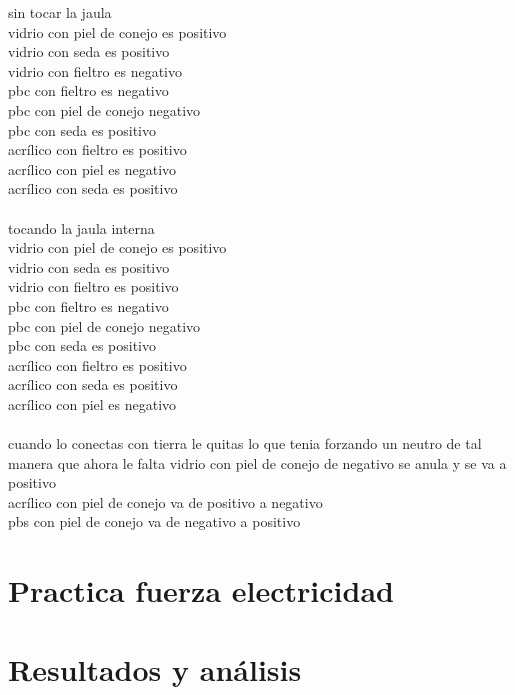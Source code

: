 \documentclass{article}
\begin{document}
\begin{multicols}{2}
	sin tocar la jaula \\
	vidrio con piel de conejo es positivo \\
	vidrio con seda es positivo \\
	vidrio con fieltro es negativo \\
	pbc con fieltro es negativo \\
	pbc con piel de conejo negativo \\
	pbc con seda es positivo \\
	acrílico con fieltro es positivo \\
	acrílico con piel es negativo \\
	acrílico con seda es positivo \\
	\\
	tocando la jaula interna \\
	vidrio con piel de conejo es positivo \\
	vidrio con seda es positivo \\
	vidrio con fieltro es positivo \\
	pbc con fieltro es negativo \\
	pbc con piel de conejo negativo \\
	pbc con seda es positivo \\
	acrílico con fieltro es positivo \\
	acrílico con seda es positivo \\
	acrílico con piel es negativo \\
	\\
	cuando lo conectas con tierra le quitas lo que tenia forzando un neutro de tal manera que ahora le falta
	vidrio con piel de conejo de negativo se anula y se va a positivo\\
	acrílico con piel de conejo va de positivo a negativo \\
	pbs con piel de conejo va de negativo a positivo \\

\section{Practica fuerza electricidad}\label{Practica fuerza electricidad}


\end{multicols}
\section{Resultados y análisis}\label{Resultados}			%
\end{document}
